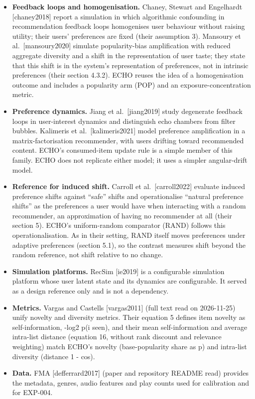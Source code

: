 \documentclass[
]{article}
\providecommand{\tightlist}{%
  \setlength{\itemsep}{0pt}\setlength{\parskip}{0pt}}
\begin{document}
\begin{itemize}
\tightlist
\item
  \textbf{Feedback loops and homogenisation.} Chaney, Stewart and
  Engelhardt {[}chaney2018{]} report a simulation in which algorithmic
  confounding in recommendation feedback loops homogenises user
  behaviour without raising utility; their users' preferences are fixed
  (their assumption 3). Mansoury et al.~{[}mansoury2020{]} simulate
  popularity-bias amplification with reduced aggregate diversity and a
  shift in the representation of user taste; they state that this shift
  is in the system's representation of preferences, not in intrinsic
  preferences (their section 4.3.2). ECHO reuses the idea of a
  homogenisation outcome and includes a popularity arm (POP) and an
  exposure-concentration metric.
\item
  \textbf{Preference dynamics.} Jiang et al.~{[}jiang2019{]} study
  degenerate feedback loops in user-interest dynamics and distinguish
  echo chambers from filter bubbles. Kalimeris et
  al.~{[}kalimeris2021{]} model preference amplification in a
  matrix-factorisation recommender, with users drifting toward
  recommended content. ECHO's consumed-item update rule is a simple
  member of this family. ECHO does not replicate either model; it uses a
  simpler angular-drift model.
\item
  \textbf{Reference for induced shift.} Carroll et al.~{[}carroll2022{]}
  evaluate induced preference shifts against ``safe'' shifts and
  operationalise ``natural preference shifts'' as the preferences a user
  would have when interacting with a random recommender, an
  approximation of having no recommender at all (their section 5).
  ECHO's uniform-random comparator (RAND) follows this
  operationalisation. As in their setting, RAND itself moves preferences
  under adaptive preferences (section 5.1), so the contrast measures
  shift beyond the random reference, not shift relative to no change.
\item
  \textbf{Simulation platforms.} RecSim {[}ie2019{]} is a configurable
  simulation platform whose user latent state and its dynamics are
  configurable. It served as a design reference only and is not a
  dependency.
\item
  \textbf{Metrics.} Vargas and Castells {[}vargas2011{]} (full text read
  on 2026-11-25) unify novelty and diversity metrics. Their equation 5
  defines item novelty as self-information, -log2 p(i \textbar{} seen),
  and their mean self-information and average intra-list distance
  (equation 16, without rank discount and relevance weighting) match
  ECHO's novelty (base-popularity share as p) and intra-list diversity
  (distance 1 - cos).
\item
  \textbf{Data.} FMA {[}defferrard2017{]} (paper and repository README
  read) provides the metadata, genres, audio features and play counts
  used for calibration and for EXP-004.
\end{itemize}
\end{document}
